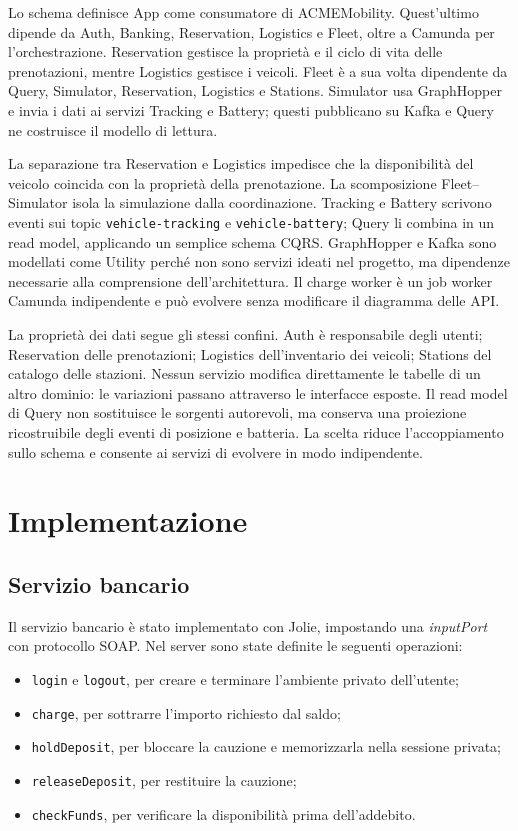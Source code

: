 \documentclass[12pt,a4paper,twoside]{report}
\newcommand{\capitoloNum}[1]{\chapter{#1}}
\newcommand{\code}[1]{\texttt{#1}}
\begin{document}
Lo schema definisce App come consumatore di ACMEMobility. Quest'ultimo dipende
da Auth, Banking, Reservation, Logistics e Fleet, oltre a Camunda per
l'orchestrazione. Reservation gestisce la proprietà e il ciclo di vita delle
prenotazioni, mentre Logistics gestisce i veicoli. Fleet è a sua volta
dipendente da Query, Simulator, Reservation, Logistics e Stations. Simulator
usa GraphHopper e invia i dati ai servizi Tracking e Battery; questi
pubblicano su Kafka e Query ne costruisce il modello di lettura.

La separazione tra Reservation e Logistics impedisce che la disponibilità
del veicolo coincida con la proprietà della prenotazione. La scomposizione
Fleet--Simulator isola la simulazione dalla coordinazione. Tracking e Battery
scrivono eventi sui topic \code{vehicle-tracking} e
\code{vehicle-battery}; Query li combina in un read model, applicando un
semplice schema CQRS. GraphHopper e Kafka sono modellati come Utility perché
non sono servizi ideati nel progetto, ma dipendenze necessarie alla
comprensione dell'architettura. Il charge worker è un job worker Camunda
indipendente e può evolvere senza modificare il diagramma delle API.

La proprietà dei dati segue gli stessi confini. Auth è responsabile degli
utenti; Reservation delle prenotazioni; Logistics dell'inventario dei
veicoli; Stations del catalogo delle stazioni. Nessun servizio modifica
direttamente le tabelle di un altro dominio: le variazioni passano attraverso
le interfacce esposte. Il read model di Query non sostituisce le sorgenti
autorevoli, ma conserva una proiezione ricostruibile degli eventi di
posizione e batteria. La scelta riduce l'accoppiamento sullo schema e
consente ai servizi di evolvere in modo indipendente.

\capitoloNum{Implementazione}

\section{Servizio bancario}

Il servizio bancario è stato implementato con Jolie, impostando una
\emph{inputPort} con protocollo SOAP. Nel server sono state definite le
seguenti operazioni:
\begin{itemize}
  \item \code{login} e \code{logout}, per creare e terminare l'ambiente
        privato dell'utente;
  \item \code{charge}, per sottrarre l'importo richiesto dal saldo;
  \item \code{holdDeposit}, per bloccare la cauzione e memorizzarla nella
        sessione privata;
  \item \code{releaseDeposit}, per restituire la cauzione;
  \item \code{checkFunds}, per verificare la disponibilità prima
        dell'addebito.
\end{itemize}
\end{document}

